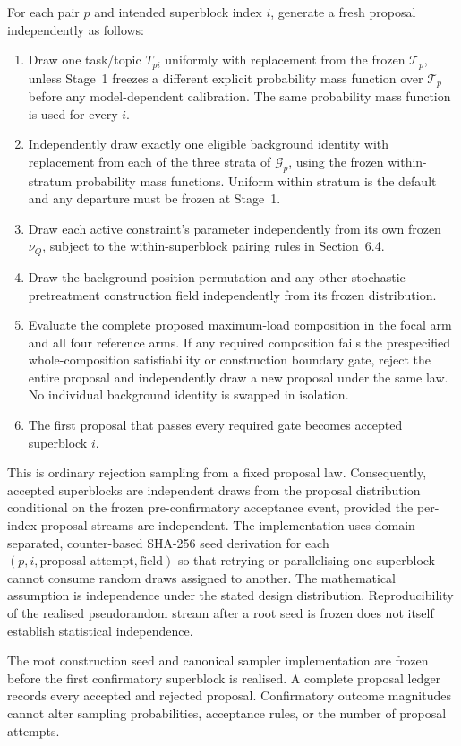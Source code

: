 \documentclass[11pt,a4paper]{article}
\begin{document}
For each pair $p$ and intended superblock index $i$, generate a fresh proposal independently as follows:
\begin{enumerate}
\item Draw one task/topic $T_{pi}$ uniformly with replacement from the frozen $\mathcal T_p$, unless Stage~1 freezes a different explicit probability mass function over $\mathcal T_p$ before any model-dependent calibration. The same probability mass function is used for every $i$.
\item Independently draw exactly one eligible background identity with replacement from each of the three strata of $\mathcal G_p$, using the frozen within-stratum probability mass functions. Uniform within stratum is the default and any departure must be frozen at Stage~1.
\item Draw each active constraint's parameter independently from its own frozen $\nu_Q$, subject to the within-superblock pairing rules in Section~6.4.
\item Draw the background-position permutation and any other stochastic pretreatment construction field independently from its frozen distribution.
\item Evaluate the complete proposed maximum-load composition in the focal arm and all four reference arms. If any required composition fails the prespecified whole-composition satisfiability or construction boundary gate, reject the entire proposal and independently draw a new proposal under the same law. No individual background identity is swapped in isolation.
\item The first proposal that passes every required gate becomes accepted superblock $i$.
\end{enumerate}

This is ordinary rejection sampling from a fixed proposal law. Consequently, accepted superblocks are independent draws from the proposal distribution conditional on the frozen pre-confirmatory acceptance event, provided the per-index proposal streams are independent. The implementation uses domain-separated, counter-based SHA-256 seed derivation for each $(p,i,\text{proposal attempt},\text{field})$ so that retrying or parallelising one superblock cannot consume random draws assigned to another. The mathematical assumption is independence under the stated design distribution. Reproducibility of the realised pseudorandom stream after a root seed is frozen does not itself establish statistical independence.

The root construction seed and canonical sampler implementation are frozen before the first confirmatory superblock is realised. A complete proposal ledger records every accepted and rejected proposal. Confirmatory outcome magnitudes cannot alter sampling probabilities, acceptance rules, or the number of proposal attempts.
\end{document}
